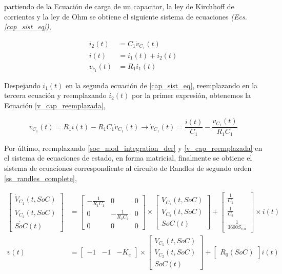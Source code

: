 \documentclass[10pt,a4paper]{article}
\begin{document}
partiendo de la Ecuaci\'on de carga de un capacitor, la ley de Kirchhoff de
corrientes y la ley de Ohm se obtiene el siguiente sistema de ecuaciones
\emph{(Ecs. \ref{cap_sist_eq})},

\begin{align}
    i_2(t) &= C_1 \dot{v}_{C_1}(t)\nonumber\\
    i(t) &= i_1(t) + i_2(t)\label{cap_sist_eq}\\
    v_{c_1}(t) &= R_1i_1(t)\nonumber
\end{align}

Despejando $i_1(t)$ en la segunda ecuaci\'on de \ref{cap_sist_eq}, reemplazando
en la tercera ecuaci\'on y reemplazando $i_2(t)$ por la primer expresi\'on,
obtenemos la Ecuaci\'on \ref{v_cap_reemplazada},

\begin{equation}
    v_{C_1}(t) = R_1i(t) - R_1C_1\dot{v}_{C_1}(t) \rightarrow 
    \dot{v}_{C_1}(t) = \frac{i(t)}{C_1} -
    \frac{v_{C_1}(t)}{R_1C_1}\label{v_cap_reemplazada}
\end{equation}

Por \'ultimo, reemplazando \ref{soc_mod_integration_der} y
\ref{v_cap_reemplazada} en el sistema de ecuaciones de estado, en forma
matricial, finalmente se obtiene el sistema de ecuaciones correspondiente al
circuito de Randles de segundo orden \ref{ss_randles_complete},

\begin{align}
    \begin{bmatrix}
        \dot{V}_{C_1}(t, SoC) \\ \dot{V}_{C_2}(t, SoC) \\ \dot{SoC}(t)
    \end{bmatrix} &= 
    \begin{bmatrix}
        -\frac{1}{R_1C_1} & 0 & 0\\
        0 & -\frac{1}{R_2C_2} & 0\\
        0 & 0 & 0
    \end{bmatrix}
    \times\begin{bmatrix}V_{C_1}(t, SoC) \\ V_{C_2}(t, SoC) \\ SoC(t)\end{bmatrix}
    +
    \begin{bmatrix}
        \frac{1}{C_1} \\ \frac{1}{C_2} \\ \frac{1}{3600S_{c,a}}
    \end{bmatrix}
    \times i(t)\nonumber \\
    v(t) &= \begin{bmatrix} -1 & -1 & -K_e \end{bmatrix} \times 
    \begin{bmatrix} V_{C_1}(t, SoC) \\ V_{C_2}(t, SoC) \\ SoC(t) \end{bmatrix} +
    \begin{bmatrix} R_0(SoC) \end{bmatrix} i(t)\label{ss_randles_complete}
\end{align}
\end{document}
